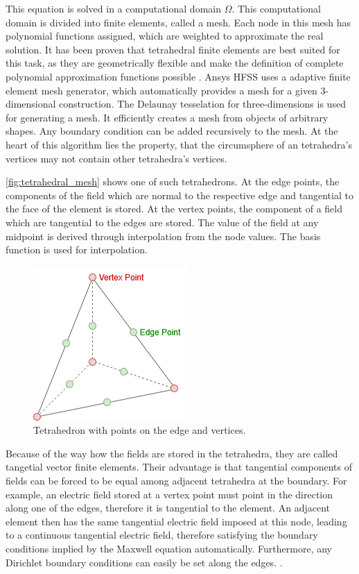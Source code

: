 This equation is solved in a computational domain $\Omega$. This computational domain is divided into finite elements, called a mesh. Each node in this mesh has polynomial functions assigned, which are weighted to approximate the real solution. It has been proven that tetrahedral finite elements are best suited for this task, as they are geometrically flexible and make the definition of complete polynomial approximation functions possible \cite{Shenton_Cendes_1985}. Ansys HFSS uses a adaptive finite element mesh generator, which automatically provides a mesh for a given 3-dimensional construction. The Delaunay tesselation for three-dimensions is used for generating a mesh. It efficiently creates a mesh from objects of arbitrary shapes. Any boundary condition can be added recursively to the mesh. At the heart of this algorithm lies the property, that the circumsphere of an tetrahedra's vertices may not contain other tetrahedra's vertices. 

\autoref{fig:tetrahedral_mesh} shows one of such tetrahedrons. At the edge points, the components of the field which are normal to the respective edge and tangential to the face of the element is stored. At the vertex points, the component of a field which are tangential to the edges are stored. The value of the field at any midpoint is derived through interpolation from the node values. The basis function is used for interpolation.

\begin{figure}[h]
    \centering
    \includegraphics[width=0.25\linewidth]{Documentation/content/10_theory/img/tetrahedral_mesh.png}
    \caption{Tetrahedron with points on the edge and vertices.}
    \label{fig:tetrahedral_mesh}
\end{figure}

Because of the way how the fields are stored in the tetrahedra, they are called tangetial vector finite elements. Their advantage is that tangential components of fields can be forced to be equal among adjacent tetrahedra at the boundary. For example, an electric field stored at a vertex point must point in the direction along one of the edges, therefore it is tangential to the element. An adjacent element then has the same tangential electric field imposed at this node, leading to a continuous tangential electric field, therefore satisfying the boundary conditions implied by the Maxwell equation automatically. Furthermore, any Dirichlet boundary conditions can easily be set along the edges.
\cite{85399}. 


